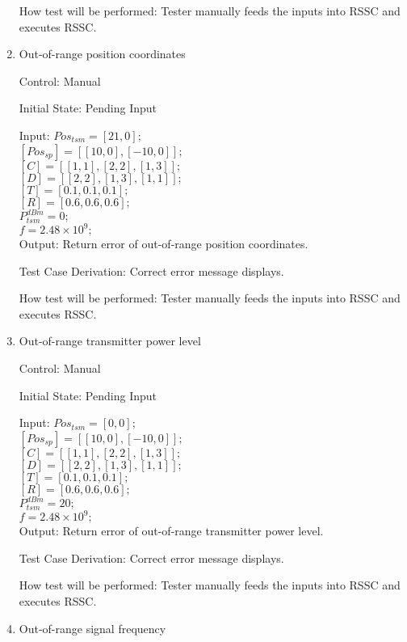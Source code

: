 \documentclass[12pt, titlepage]{article}
\begin{document}
\begin{enumerate}
How test will be performed: Tester manually feeds the inputs into
RSSC and executes RSSC.


\item{Out-of-range position coordinates\\}

Control: Manual
					
Initial State: Pending Input
					
Input:
$Pos_{tsm} = [21,0];$\\
$[Pos_{sp}] = [[10,0],[-10,0]];$\\
$[C] = [[1,1],[2,2],[1,3]];$\\
$[D] = [[2,2],[1,3],[1,1]];$\\
$[T] = [0.1,0.1,0.1];$\\
$[R] = [0.6,0.6,0.6];$\\
$P_{tsm}^{dBm} = 0;$\\
$f = 2.48\times10^{9};$\\

Output: Return error of out-of-range position coordinates.

Test Case Derivation: Correct error message displays.
					
How test will be performed: Tester manually feeds the inputs into
RSSC and executes RSSC.


\item{Out-of-range transmitter power level\\}

Control: Manual
					
Initial State: Pending Input
					
Input:
$Pos_{tsm} = [0,0];$\\
$[Pos_{sp}] = [[10,0],[-10,0]];$\\
$[C] = [[1,1],[2,2],[1,3]];$\\
$[D] = [[2,2],[1,3],[1,1]];$\\
$[T] = [0.1,0.1,0.1];$\\
$[R] = [0.6,0.6,0.6];$\\
$P_{tsm}^{dBm} = 20;$\\
$f = 2.48\times10^{9};$\\

Output: Return error of out-of-range transmitter power level.

Test Case Derivation: Correct error message displays.
					
How test will be performed: Tester manually feeds the inputs into
RSSC and executes RSSC.


\item{Out-of-range signal frequency\\}


\end{enumerate}
\end{document}

